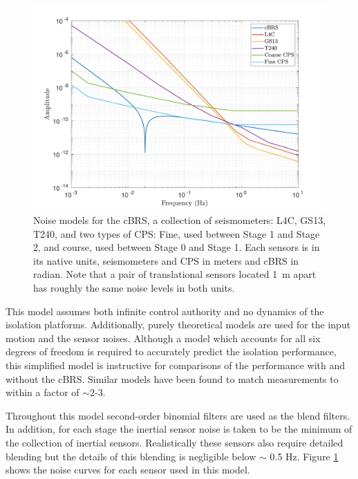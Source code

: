 \documentclass [12pt, proquest]{uwthesis}[2019]
\begin{document}
\begin{figure}[!h]
\begin{center}
\includegraphics[width=\textwidth]{cBRS_Model_Noise.pdf}
\caption[Noise models for the cBRS, a collection of seismometers, and two types of CPS]{Noise models for the cBRS, a collection of seismometers: L4C, GS13, T240, and two types of CPS: Fine, used between Stage 1 and Stage 2, and course, used between Stage 0 and Stage 1. Each sensors is in its native units, seismometers and CPS in meters and cBRS in radian. Note that a pair of translational sensors located 1~m apart has roughly the same noise levels in both units.}
\label{sensNoise}
\end{center}
\end{figure}

This model assumes both infinite control authority and no dynamics of the isolation platforms. Additionally, purely theoretical models are used for the input motion and the sensor noises. Although a model which accounts for all six degrees of freedom is required to accurately predict the isolation performance, this simplified model is instructive for comparisons of the performance with and without the cBRS. Similar models \cite{windproofing} have been found to match measurements to within a factor of $\sim$2-3.

Throughout this model second-order binomial filters are used as the blend filters. In addition, for each stage the inertial sensor noise is taken to be the minimum of the collection of inertial sensors. Realistically these sensors also require detailed blending but the details of this blending is negligible below $\sim$ 0.5 Hz. Figure \ref{sensNoise} shows the noise curves for each sensor used in this model.
\end{document}
